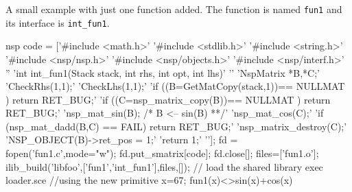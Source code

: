 \begin{examples}
  A small example with just one function added. The function 
  is named \verb!fun1! and its interface is \verb!int_fun1!.
  \begin{mintednsp}{nsp}
    code = ['#include <math.h>'
            '#include <stdlib.h>'
            '#include <string.h>'
            '#include <nsp/nsp.h>'
            '#include <nsp/objects.h>'
            '#include <nsp/interf.h>'
            ''
            'int int_fun1(Stack stack, int rhs, int opt, int lhs)'
            '{'
              'NspMatrix *B,*C;'
              'CheckRhs(1,1);'
              'CheckLhs(1,1);'
              'if ((B=GetMatCopy(stack,1))== NULLMAT ) return RET_BUG;'
              'if ((C=nsp_matrix_copy(B))== NULLMAT ) return RET_BUG;'
              'nsp_mat_sin(B); /* B <-- sin(B) **/'
              'nsp_mat_cos(C);'
              'if (nsp_mat_dadd(B,C) == FAIL) return RET_BUG;'
              'nsp_matrix_destroy(C);'
              'NSP_OBJECT(B)->ret_pos = 1;'
              'return 1;'
            '}'];
    fd = fopen('fun1.c',mode="w");
    fd.put_smatrix[code];
    fd.close[];
    files=['fun1.o'];
    ilib_build('libfoo',['fun1','int_fun1'],files,[]);
    // load the shared library 
    exec loader.sce 
    //using the new primitive 
    x=67;
    fun1(x)<>sin(x)+cos(x)
  \end{mintednsp}
\end{examples}
\begin{manseealso}
\end{manseealso}

